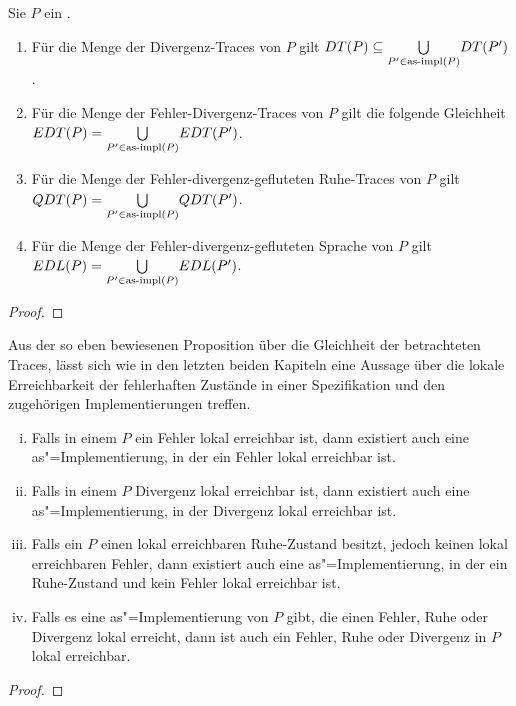 \begin{Prop}
  Sie $P$ ein \MEIO{}.
  \begin{enumerate}
    \item Für die Menge der Divergenz-Traces von $P$ gilt $DT (P) \subseteq
      \underset{P'\in\mathrm{as}\text{-}\mathrm{impl} (P)}{\bigcup} DT (P')$.
    \item Für die Menge der Fehler-Divergenz-Traces von $P$ gilt die folgende
      Gleichheit $EDT (P) = \underset{P'\in\mathrm{as}\text{-}\mathrm{impl} (P)}{\bigcup} EDT (P')$.
    \item Für die Menge der Fehler-divergenz-gefluteten Ruhe-Traces von $P$
      gilt $QDT (P) = \underset{P'\in\mathrm{as}\text{-}\mathrm{impl} (P)}{\bigcup} QDT (P')$.
    \item Für die Menge der Fehler-divergenz-gefluteten Sprache von $P$ gilt
      $EDL (P) = \underset{P'\in\mathrm{as}\text{-}\mathrm{impl} (P)}{\bigcup} EDL (P')$.
  \end{enumerate}
\end{Prop}
\begin{proof}
\end{proof}

Aus der so eben bewiesenen Proposition über die Gleichheit der betrachteten
Traces, lässt sich wie in den letzten beiden Kapiteln eine Aussage über die
lokale Erreichbarkeit der \glqq fehlerhaften Zustände\grqq{} in einer
Spezifikation und den zugehörigen Implementierungen treffen.

\begin{Kor}
  \begin{enumerate}[(i)]
    \item Falls in einem \MEIO{} $P$ ein Fehler lokal erreichbar ist, dann
      existiert auch eine as"=Implementierung, in der ein Fehler lokal
      erreichbar ist.
    \item Falls in einem \MEIO{} $P$ Divergenz lokal erreichbar ist, dann
      existiert auch eine as"=Implementierung, in der Divergenz lokal erreichbar
      ist.
    \item Falls ein \MEIO{} $P$ einen lokal erreichbaren Ruhe-Zustand besitzt,
      jedoch keinen lokal erreichbaren Fehler, dann existiert auch eine
      as"=Implementierung, in der ein Ruhe-Zustand und kein Fehler lokal
      erreichbar ist.
    \item Falls es eine as"=Implementierung von $P$ gibt, die einen Fehler,
      Ruhe oder Divergenz lokal erreicht, dann ist auch ein Fehler, Ruhe oder
      Divergenz in $P$ lokal erreichbar.
  \end{enumerate}
\end{Kor}
\begin{proof}
\end{proof}

